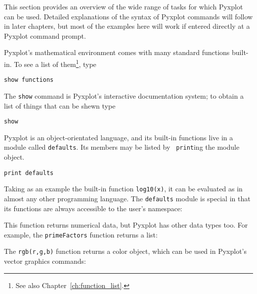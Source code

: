 This section provides an overview of the wide range of tasks for which Pyxplot
can be used. Detailed explanations of the syntax of Pyxplot commands will
follow in later chapters, but most of the examples here will work if entered
directly at a Pyxplot command prompt.


Pyxplot's mathematical environment comes with many standard functions built-in.
To see a list of them\footnote{See also Chapter~\ref{ch:function_list}.}, type

\begin{verbatim}
show functions
\end{verbatim}

The {\tt show} command is Pyxplot's interactive documentation system; to obtain
a list of things that can be shewn type

\begin{verbatim}
show
\end{verbatim}

\noindent Pyxplot is an object-orientated language, and its built-in functions
live in a module called {\tt defaults}.  Its members may be listed by {\tt
print}ing the module object. 

\begin{verbatim}
print defaults
\end{verbatim}

Taking as an example the built-in function {\tt log10(x)}, it can be evaluated
as in almost any other programming language. The {\tt defaults} module
is special in that its functions are always accessible to the user's namespace:

\vspace{3mm}

\vspace{3mm}

\noindent This function returns numerical data, but Pyxplot has other data
types too.  For example, the {\tt primeFactors} function returns a list:

\vspace{3mm}

\vspace{3mm}

\noindent The {\tt rgb(r,g,b)} function returns a color object, which can be
used in Pyxplot's vector graphics commands:

\vspace{3mm}

\vspace{3mm}

